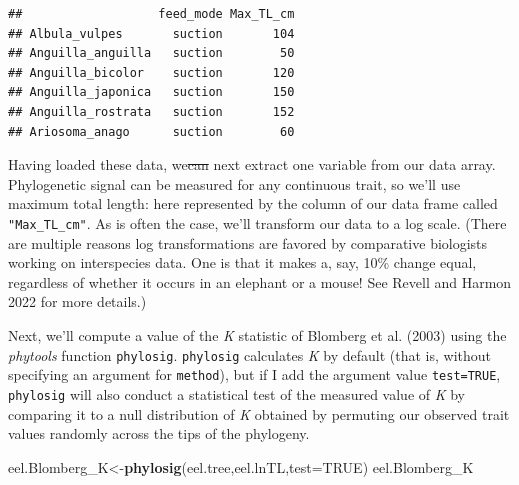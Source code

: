\documentclass[fleqn,10pt,lineno]{wlpeerj}
\newenvironment{Shaded}{\begin{snugshade}}{\end{snugshade}}
\newcommand{\AttributeTok}[1]{\textcolor[rgb]{0.13,0.29,0.53}{#1}}
\newcommand{\ConstantTok}[1]{\textcolor[rgb]{0.56,0.35,0.01}{#1}}
\newcommand{\FunctionTok}[1]{\textcolor[rgb]{0.13,0.29,0.53}{\textbf{#1}}}
\newcommand{\NormalTok}[1]{#1}
\newcommand{\OtherTok}[1]{\textcolor[rgb]{0.56,0.35,0.01}{#1}}
\newcommand{\SpecialCharTok}[1]{\textcolor[rgb]{0.81,0.36,0.00}{\textbf{#1}}}
\providecommand{\DIFaddtex}[1]{{\protect\color{blue}\uwave{#1}}} %
\providecommand{\DIFdeltex}[1]{{\protect\color{red}\sout{#1}}}                      %
\providecommand{\DIFaddbegin}{} %
\providecommand{\DIFaddend}{} %
\providecommand{\DIFdelbegin}{} %
\providecommand{\DIFdelend}{} %
\providecommand{\DIFadd}[1]{\texorpdfstring{\DIFaddtex{#1}}{#1}} %
\providecommand{\DIFdel}[1]{\texorpdfstring{\DIFdeltex{#1}}{}} %
\newcommand{\DIFscaledelfig}{0.5}
\newlength{\DIFdelgraphicswidth} %
\newlength{\DIFdelgraphicsheight} %
\newcommand{\DIFaddincludegraphics}[2][]{{\color{blue}\fbox{\DIFOincludegraphics[#1]{#2}}}} %
\newcommand{\DIFdelincludegraphics}[2][]{%
\sbox{\DIFdelgraphicsbox}{\DIFOincludegraphics[#1]{#2}}%
\settoboxwidth{\DIFdelgraphicswidth}{\DIFdelgraphicsbox} %
\settoboxtotalheight{\DIFdelgraphicsheight}{\DIFdelgraphicsbox} %
\scalebox{\DIFscaledelfig}{%
\parbox[b]{\DIFdelgraphicswidth}{\usebox{\DIFdelgraphicsbox}\\[-\baselineskip] \rule{\DIFdelgraphicswidth}{0em}}\llap{\resizebox{\DIFdelgraphicswidth}{\DIFdelgraphicsheight}{%
\setlength{\unitlength}{\DIFdelgraphicswidth}%
\begin{picture}(1,1)%
\thicklines\linethickness{2pt} %
{\color[rgb]{1,0,0}\put(0,0){\framebox(1,1){}}}%
{\color[rgb]{1,0,0}\put(0,0){\line( 1,1){1}}}%
{\color[rgb]{1,0,0}\put(0,1){\line(1,-1){1}}}%
\end{picture}%
}\hspace*{3pt}}} %
} %
\DeclareRobustCommand{\DIFaddbegin}{\DIFOaddbegin \let\includegraphics\DIFaddincludegraphics} %
\DeclareRobustCommand{\DIFaddend}{\DIFOaddend \let\includegraphics\DIFOincludegraphics} %
\DeclareRobustCommand{\DIFdelbegin}{\DIFOdelbegin \let\includegraphics\DIFdelincludegraphics} %
\DeclareRobustCommand{\DIFdelend}{\DIFOaddend \let\includegraphics\DIFOincludegraphics} %
\begin{document}
\begin{verbatim}
##                   feed_mode Max_TL_cm
## Albula_vulpes       suction       104
## Anguilla_anguilla   suction        50
## Anguilla_bicolor    suction       120
## Anguilla_japonica   suction       150
## Anguilla_rostrata   suction       152
## Ariosoma_anago      suction        60
\end{verbatim}

Having loaded these data, we\DIFdelbegin \DIFdel{can }\DIFdelend \DIFaddbegin \DIFadd{'ll }\DIFaddend next extract one variable from our data
array. Phylogenetic signal can be measured for any continuous trait, so
we'll use maximum total length: here represented by the column of our
data frame called \texttt{"Max\_TL\_cm"}. As is often the case, we'll
transform our data to a log scale. (There are multiple reasons log
transformations are favored by comparative biologists working on
interspecies data. One is that it makes a, say, 10\% change equal,
regardless of whether it occurs in an elephant or a mouse! See Revell
and Harmon 2022 for more details.)

\begin{Shaded}
\end{Shaded}

Next, we'll compute a value of the \emph{K} statistic of Blomberg et al.
(2003) using the \emph{phytools} function \texttt{phylosig}.
\texttt{phylosig} calculates \emph{K} by default (that is, without
specifying an argument for \texttt{method}), but if I add the argument
value \texttt{test=TRUE}, \texttt{phylosig} will also conduct a
statistical test of the measured value of \emph{K} by comparing it to a
null distribution of \emph{K} obtained by permuting our observed trait
values randomly across the tips of the phylogeny.

\begin{Shaded}
\begin{Highlighting}[]
\NormalTok{eel.Blomberg\_K}\OtherTok{\textless{}{-}}\FunctionTok{phylosig}\NormalTok{(eel.tree,eel.lnTL,}\AttributeTok{test=}\ConstantTok{TRUE}\NormalTok{)}
\NormalTok{eel.Blomberg\_K}
\end{Highlighting}
\end{Shaded}
\end{document}
